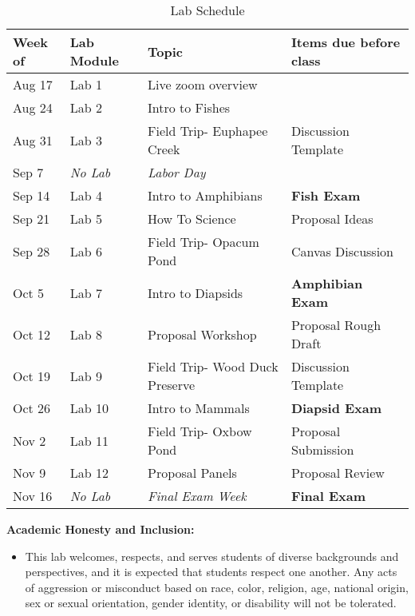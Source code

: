\documentclass{book}
\begin{document}
\centering
\begin{table}[h]
\label{Table:Schedule}
\caption{Lab Schedule}
\begin{tabular}{llll}\hline
Week of & Lab Module          & Topic                           & Items due before class  \\ \hline
Aug 17  & Lab 1               & Live zoom overview              &                         \\
Aug 24  & Lab 2               & Intro to Fishes                 &                         \\
Aug 31  & Lab 3               & Field Trip- Euphapee Creek      & Discussion Template     \\
Sep 7   & \textit{No Lab}     & \textit{Labor Day}              &                         \\
Sep 14  & Lab 4               & Intro to Amphibians             & \textbf{Fish Exam}      \\
Sep 21  & Lab 5               & How To Science                  & Proposal Ideas          \\
Sep 28  & Lab 6               & Field Trip- Opacum Pond         & Canvas Discussion       \\
Oct 5   & Lab 7               & Intro to Diapsids               & \textbf{Amphibian Exam} \\
Oct 12  & Lab 8               & Proposal Workshop               & Proposal Rough Draft    \\
Oct 19  & Lab 9               & Field Trip- Wood Duck Preserve  & Discussion Template     \\
Oct 26  & Lab 10              & Intro to Mammals                & \textbf{Diapsid Exam}   \\
Nov 2   & Lab 11              & Field Trip- Oxbow Pond          & Proposal Submission     \\
Nov 9   & Lab 12              & Proposal Panels                 & Proposal Review         \\
Nov 16  & \textit{No Lab}     & \textit{Final Exam Week}        & \textbf{Final Exam}     \\ \hline
\end{tabular}
\bigskip{}
\end{table}


\noindent\textbf{Academic Honesty and Inclusion:}
\begin{itemize}
\item{This lab welcomes, respects, and serves students of diverse backgrounds and perspectives, and it is expected that students respect one another. Any acts of aggression or misconduct based on race, color, religion, age, national origin, sex or sexual orientation, gender identity, or disability will not be tolerated.}
\end{itemize} 

  
\end{document}
